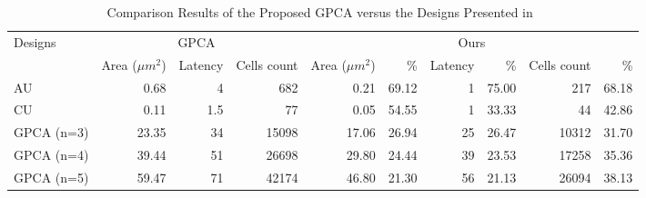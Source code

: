 \documentclass[9pt,journal,compsoc]{IEEEtran}
\begin{document}
\begin{table}[h]
\caption{Comparison Results of the Proposed GPCA versus the Designs Presented in~\cite{2}}\vspace{-3ex}
\centering
\begin{tabularx}{\textwidth}{Xrrrrrrrrr}
\toprule
            \multirow{2}{*}{Designs}& \multicolumn{3}{c}{GPCA~\cite{2}}&\multicolumn{6}{c}{ Ours }\\
            \cmidrule(lr){2-4} \cmidrule(lr){5-10}
            &Area ($\mu m^2$) & Latency & Cells count &Area ($\mu m^2$) & \% &Latency & \% & Cells count &\% \\
            \midrule
            AU &0.68 &4 &682 &0.21 &69.12 &1 &75.00 &217 &68.18 \\
            CU & 0.11&1.5&77&0.05&54.55&1&33.33&44&42.86\\
            GPCA (n=3)&23.35&34&15098&17.06&26.94&25&26.47&10312&31.70\\
            GPCA (n=4)&39.44&51&26698&29.80&24.44&39&23.53&17258&35.36\\
            GPCA (n=5)&59.47&71&42174&46.80&21.30&56&21.13&26094&38.13\\
            \bottomrule
\end{tabularx}~\label{tab:result}\vspace{-3ex}
\end{table}
\end{document}
